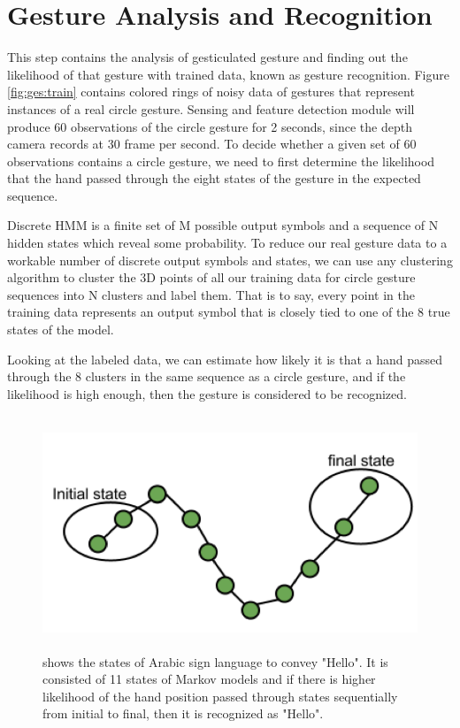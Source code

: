 \section{Gesture Analysis and Recognition}
This step contains the analysis of gesticulated gesture and finding out the likelihood of that gesture with trained data, known as gesture recognition. Figure \ref{fig:ges:train}  contains colored rings of noisy data of gestures that represent instances of a real circle gesture. Sensing and feature detection module will produce 60 observations of the circle gesture for 2 seconds, since the depth camera records at 30 frame per second. To decide whether a given set of 60 observations contains a circle gesture, we need to first determine the likelihood that the hand passed through the eight states of the gesture in the expected sequence.

Discrete HMM is a finite set of M possible output symbols and a sequence of N hidden states which reveal some probability. To reduce our real gesture data to a workable number of discrete output symbols and states, we can use any clustering algorithm to cluster the 3D points of all our training data for circle gesture sequences into N clusters and label them. That is to say, every point in the training data represents an output symbol that is closely tied to one of the 8 true states of the model.

Looking at the labeled data, we can estimate how likely it is that a hand passed through the 8 clusters in the same sequence as a circle gesture, and if the likelihood is high enough, then the gesture is considered to be recognized.

\begin{figure}
	[h] \centering 
	\includegraphics[height=7cm]{figures/ges-rec.png} \caption{shows the states of Arabic sign language to convey "Hello". It is consisted of 11 states of Markov models and if there is higher likelihood of the hand position passed through states sequentially from initial to final, then it is recognized as "Hello".} \label{fig:ges:reg} 
\end{figure}

